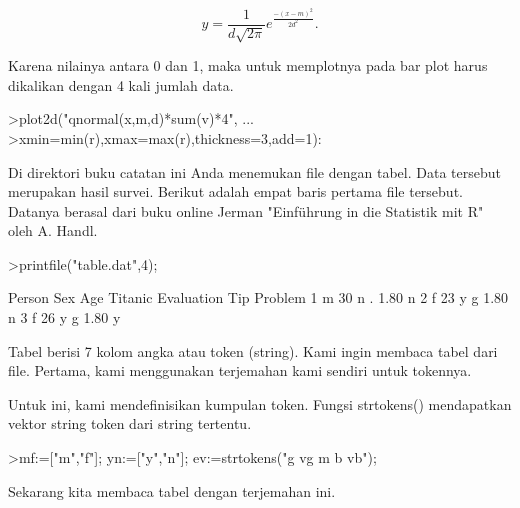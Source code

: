 \documentclass{article}
\begin{document}
\begin{eulernotebook}
\begin{eulercomment}
\begin{eulercomment}
\begin{eulercomment}
\end{eulercomment}
\begin{eulerformula}
\[
y=\frac{1}{d\sqrt{2\pi}}e^{\frac{-(x-m)^2}{2d^2}}.
\]
\end{eulerformula}
\begin{eulercomment}
Karena nilainya antara 0 dan 1, maka untuk memplotnya pada bar plot
harus dikalikan dengan 4 kali jumlah data.
\end{eulercomment}
\begin{eulerprompt}
>plot2d("qnormal(x,m,d)*sum(v)*4", ...
>xmin=min(r),xmax=max(r),thickness=3,add=1):
\end{eulerprompt}
\begin{eulercomment}
Di direktori buku catatan ini Anda menemukan file dengan tabel. Data
tersebut merupakan hasil survei. Berikut adalah empat baris pertama
file tersebut. Datanya berasal dari buku online Jerman "Einführung in
die Statistik mit R" oleh A. Handl.
\end{eulercomment}
\begin{eulerprompt}
>printfile("table.dat",4);
\end{eulerprompt}
\begin{euleroutput}
  Person Sex Age Titanic Evaluation Tip Problem
  1 m 30 n . 1.80 n
  2 f 23 y g 1.80 n
  3 f 26 y g 1.80 y
\end{euleroutput}
\begin{eulercomment}
Tabel berisi 7 kolom angka atau token (string). Kami ingin membaca
tabel dari file. Pertama, kami menggunakan terjemahan kami sendiri
untuk tokennya.

Untuk ini, kami mendefinisikan kumpulan token. Fungsi strtokens()
mendapatkan vektor string token dari string tertentu.
\end{eulercomment}
\begin{eulerprompt}
>mf:=["m","f"]; yn:=["y","n"]; ev:=strtokens("g vg m b vb");
\end{eulerprompt}
\begin{eulercomment}
Sekarang kita membaca tabel dengan terjemahan ini.


\end{eulercomment}
\end{eulercomment}
\end{eulercomment}
\end{eulernotebook}
\end{document}
